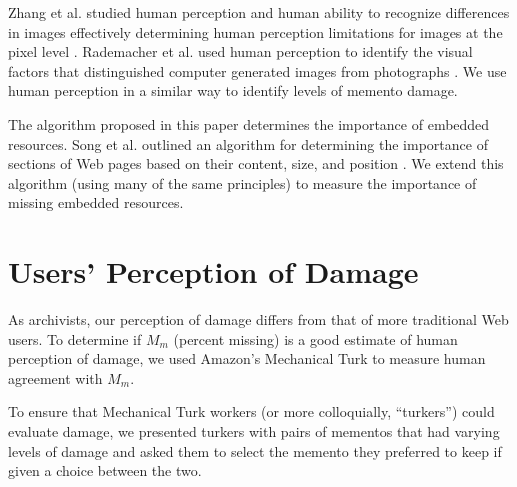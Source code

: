 Zhang et al. studied human perception and human ability to recognize differences in images effectively determining human perception limitations for images at the pixel level \cite{Zhang200830}. Rademacher et al. used human perception to identify the visual factors that distinguished computer generated images from photographs \cite{rademacher}. We use human perception in a similar way to identify levels of memento damage.

The algorithm proposed in this paper determines the importance of embedded resources. Song et al. outlined an algorithm for determining the importance of sections of Web pages based on their content, size, and position \cite{blockImportance}. We extend this algorithm (using many of the same principles) to measure the importance of missing embedded resources. 



\section{Users' Perception of Damage}
\label{turk} 


As archivists, our perception of damage differs from that of more traditional Web users. To determine if $M_m$ (percent missing) is a good estimate of human perception of damage, we used Amazon's Mechanical Turk to measure human agreement with $M_m$.

To ensure that Mechanical Turk workers (or more colloquially, ``turkers'') could evaluate damage, we presented turkers with pairs of mementos that had varying levels of damage and asked them to select the memento they preferred to keep if given a choice between the two.

